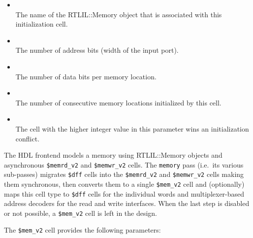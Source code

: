 \begin{itemize}
\item {} \\
The name of the RTLIL::Memory object that is associated with this initialization cell.

\item {} \\
The number of address bits (width of the  input port).

\item {} \\
The number of data bits per memory location.

\item {} \\
The number of consecutive memory locations initialized by this cell.

\item {} \\
The cell with the higher integer value in this parameter wins an initialization conflict.
\end{itemize}

The HDL frontend models a memory using RTLIL::Memory objects and asynchronous
{\tt \$memrd\_v2} and {\tt \$memwr\_v2} cells. The {\tt memory} pass (i.e.~its various sub-passes) migrates
{\tt \$dff} cells into the {\tt \$memrd\_v2} and {\tt \$memwr\_v2} cells making them synchronous, then
converts them to a single {\tt \$mem\_v2} cell and (optionally) maps this cell type
to {\tt \$dff} cells for the individual words and multiplexer-based address decoders for the read and
write interfaces. When the last step is disabled or not possible, a {\tt \$mem\_v2} cell is left in the design.

The {\tt \$mem\_v2} cell provides the following parameters:


